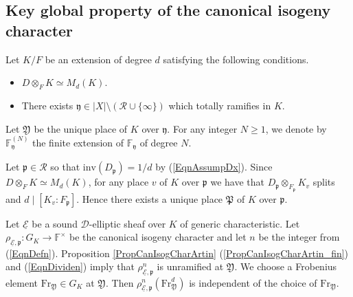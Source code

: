 \documentclass[10pt]{amsart}
\theoremstyle{plain}
\theoremstyle{definition}
\newcommand{\Fr}{\mathrm{Fr}}
\newcommand{\inv}{\mathrm{inv}}
\newcommand{\cR}{\mathcal{R}}
\newcommand{\ucE}{\underline{\mathcal{E}}}
\newcommand{\bF}{\mathbb{F}}
\newcommand{\sD}{\mathscr{D}}
\newcommand{\frP}{\mathfrak{P}}
\newcommand{\frp}{\mathfrak{p}}
\newcommand{\frY}{\mathfrak{Y}}
\newcommand{\fry}{\mathfrak{y}}
\begin{document}
\subsection{Key global property of the canonical isogeny character}\label{SubsecKeyGlobalProp}

Let $K/F$ be an extension of degree $d$ satisfying the following conditions.

\begin{itemize}
	\item $D\otimes_F K\simeq M_d(K)$.
	\item There exists $\fry\in |X|\setminus(\cR\cup\{\infty\})$ which totally ramifies in $K$. 
\end{itemize}


Let $\frY$ be the unique place of $K$ over $\fry$.
For any integer $N\geq 1$, we denote by $\bF_\fry^{(N)}$ the finite extension of $\bF_\fry$ of degree $N$.

Let $\frp\in \cR$ so that $\inv(D_\frp)=1/d$ by (\ref{EqnAssumpDx}). 
Since $D\otimes_F K\simeq M_d(K)$, for any place $v$ of $K$ over $\frp$
we have that $D_\frp\otimes_{F_\frp}K_v$ splits and $d\mid [K_v:F_\frp]$. Hence there exists a unique place $\frP$ of $K$ over $\frp$.


Let $\ucE$ be a sound $\sD$-elliptic sheaf over $K$ of generic characteristic. 
Let $\rho_{\ucE,\frp}:G_{K}\to \bF^\times$ be the canonical isogeny
character and let $n$ be the integer from (\ref{EqnDefn}). 
Proposition \ref{PropCanIsogCharArtin} (\ref{PropCanIsogCharArtin_fin}) and (\ref{EqnDividen})
imply that
$\rho_{\ucE,\frp}^n$ is unramified at $\frY$.
We choose a Frobenius element $\Fr_{\frY}\in G_{K}$ at $\frY$. Then $\rho_{\ucE,\frp}^n(\Fr_{\frY}^d)$ is independent of the choice of $\Fr_{\frY}$.
\end{document}
